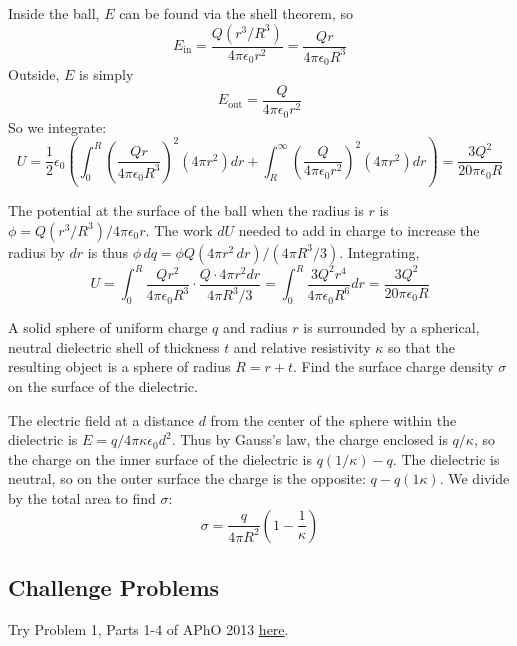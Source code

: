 \documentclass[11pt]{scrartcl}
\begin{document}
\begin{sol}
    \begin{anum}
        \item Inside the ball, $E$ can be found via the shell theorem, so $$E_{\text{in}}=\frac{Q(r^3/R^3)}{4\pi\epsilon_0r^2}=\frac{Qr}{4\pi\epsilon_0R^3}$$Outside, $E$ is simply $$E_{\text{out}}=\frac{Q}{4\pi\epsilon_0r^2}$$So we integrate: $$U=\frac12\epsilon_0\left(\int_0^R\left(\frac{Qr}{4\pi\epsilon_0R^3}\right)^2(4\pi r^2)dr+\int_R^\infty\left(\frac{Q}{4\pi\epsilon_0r^2}\right)^2(4\pi r^2)dr\right)=\boxed{\frac{3Q^2}{20\pi\epsilon_0R}}$$
        \item The potential at the surface of the ball when the radius is $r$ is $\phi=Q(r^3/R^3)/4\pi\epsilon_0r.$ The work $dU$ needed to add in charge to increase the radius by $dr$ is thus $\phi \, dq=\phi Q(4\pi r^2\, dr)/(4\pi R^3/3)$. Integrating, $$U=\int_0^R\frac{Qr^2}{4\pi\epsilon_0R^3}\cdot\frac{Q\cdot4\pi r^2dr}{4\pi R^3/3}=\int_0^R\frac{3Q^2r^4}{4\pi\epsilon_0R^6}dr=\boxed{\frac{3Q^2}{20\pi\epsilon_0R}}$$
    \end{anum}
\end{sol}

\begin{prob}
    A solid sphere of uniform charge $q$ and radius $r$ is surrounded by a spherical, neutral dielectric shell of thickness $t$ and relative resistivity $\kappa$ so that the resulting object is a sphere of radius $R=r+t$. Find the surface charge density $\sigma$ on the surface of the dielectric.
\end{prob}

\begin{sol}
    The electric field at a distance $d$ from the center of the sphere within the dielectric is $E=q/4\pi\kappa \epsilon_0d^2$. Thus by Gauss's law, the charge enclosed is $q/\kappa$, so the charge on the inner surface of the dielectric is $q(1/\kappa)-q.$ The dielectric is neutral, so on the outer surface the charge is the opposite: $q-q(1\kappa)$. We divide by the total area to find $\sigma:$ $$\sigma=\boxed{\frac{q}{4\pi R^2}\left(1-\frac1\kappa\right)}$$
\end{sol}

\subsection{Challenge Problems}

\begin{prob}
    Try Problem 1, Parts 1-4 of APhO 2013 \href{https://apho.olimpicos.net/pdf/APhO_2013_Q1.pdf}{here}.
\end{prob}
\end{document}
